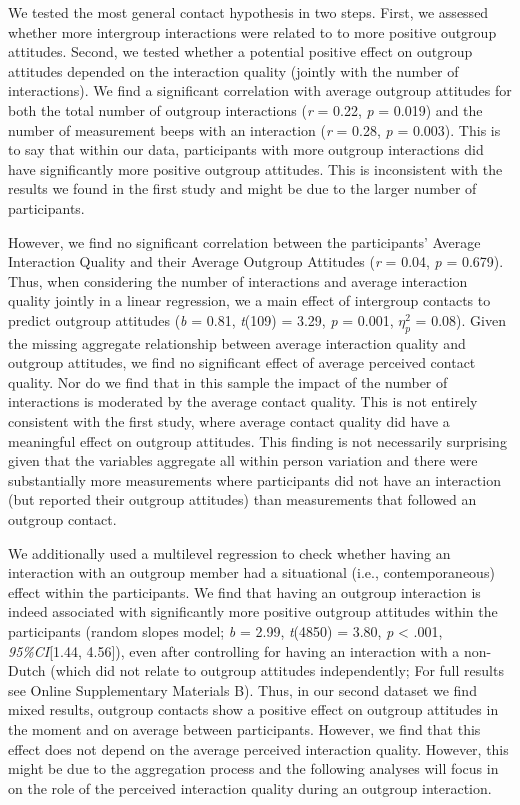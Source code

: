 We tested the most general contact hypothesis in two steps. First, we
assessed whether more intergroup interactions were related to to more
positive outgroup attitudes. Second, we tested whether a potential
positive effect on outgroup attitudes depended on the interaction
quality (jointly with the number of interactions). We find a significant
correlation with average outgroup attitudes for both the total number of
outgroup interactions (\textit{r} = 0.22, \textit{p} = 0.019) and the
number of measurement beeps with an interaction (\textit{r} = 0.28,
\textit{p} = 0.003). This is to say that within our data, participants
with more outgroup interactions did have significantly more positive
outgroup attitudes. This is inconsistent with the results we found in
the first study and might be due to the larger number of participants.

However, we find no significant correlation between the participants'
Average Interaction Quality and their Average Outgroup Attitudes
(\textit{r} = 0.04, \textit{p} = 0.679). Thus, when considering the
number of interactions and average interaction quality jointly in a
linear regression, we a main effect of intergroup contacts to predict
outgroup attitudes (\textit{b} = 0.81, \textit{t}(109) = 3.29,
\textit{p} = 0.001, \(\eta_p^2\) = 0.08). Given the missing aggregate
relationship between average interaction quality and outgroup attitudes,
we find no significant effect of average perceived contact quality. Nor
do we find that in this sample the impact of the number of interactions
is moderated by the average contact quality. This is not entirely
consistent with the first study, where average contact quality did have
a meaningful effect on outgroup attitudes. This finding is not
necessarily surprising given that the variables aggregate all within
person variation and there were substantially more measurements where
participants did not have an interaction (but reported their outgroup
attitudes) than measurements that followed an outgroup contact.

We additionally used a multilevel regression to check whether having an
interaction with an outgroup member had a situational (i.e.,
contemporaneous) effect within the participants. We find that having an
outgroup interaction is indeed associated with significantly more
positive outgroup attitudes within the participants (random slopes
model; \textit{b} = 2.99, \textit{t}(4850) = 3.80, \textit{p}
\textless{} .001, \textit{95\%CI}{[}1.44, 4.56{]}), even after
controlling for having an interaction with a non-Dutch (which did not
relate to outgroup attitudes independently; For full results see Online
Supplementary Materials B). Thus, in our second dataset we find mixed
results, outgroup contacts show a positive effect on outgroup attitudes
in the moment and on average between participants. However, we find that
this effect does not depend on the average perceived interaction
quality. However, this might be due to the aggregation process and the
following analyses will focus in on the role of the perceived
interaction quality during an outgroup interaction.

